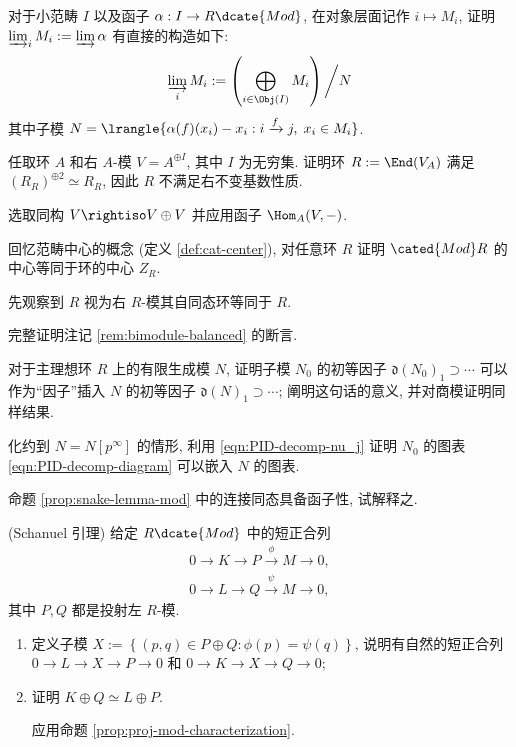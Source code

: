 \begin{Exercises}
	\item 对于小范畴 $I$ 以及函子 $\alpha: I \to R\dcate{Mod}$, 在对象层面记作 $i \mapsto M_i$, 证明 $\varinjlim_i M_i := \varinjlim \alpha$ 有直接的构造如下:
	\[ \varinjlim_i M_i := \left( \bigoplus_{i \in \Obj(I)} M_i \right) \bigg/N \]
	其中子模 $N = \lrangle{ \alpha(f)(x_i) - x_i : i \xrightarrow{f} j, \;  x_i \in M_i }$.
	\item 任取环 $A$ 和右 $A$-模 $V = A^{\oplus I}$, 其中 $I$ 为无穷集. 证明环 $R := \End(V_A)$ 满足 $(R_R)^{\oplus 2} \simeq R_R$, 因此 $R$ 不满足右不变基数性质. \begin{hint} 选取同构 $V \rightiso V \oplus V$ 并应用函子 $\Hom_A(V, -)$.\end{hint}
	\item 回忆范畴中心的概念 (定义 \ref{def:cat-center}), 对任意环 $R$ 证明 $\cated{Mod}R$ 的中心等同于环的中心 $Z_R$. \begin{hint} 先观察到 $R$ 视为右 $R$-模其自同态环等同于 $R$.\end{hint}
	\item 完整证明注记 \ref{rem:bimodule-balanced} 的断言.
	\item 对于主理想环 $R$ 上的有限生成模 $N$, 证明子模 $N_0$ 的初等因子 $\mathfrak{d}(N_0)_1 \supset \cdots$ 可以作为``因子''插入 $N$ 的初等因子 $\mathfrak{d}(N)_1 \supset \cdots$; 阐明这句话的意义, 并对商模证明同样结果. \begin{hint} 化约到 $N=N[p^\infty]$ 的情形, 利用 \eqref{eqn:PID-decomp-nu_j} 证明 $N_0$ 的图表 \eqref{eqn:PID-decomp-diagram} 可以嵌入 $N$ 的图表.\end{hint}
	\item 命题 \ref{prop:snake-lemma-mod} 中的连接同态具备函子性, 试解释之.
	\item (Schanuel 引理) 给定 $R\dcate{Mod}$ 中的短正合列
		\begin{gather*}
			0 \to K \to P \xrightarrow{\phi} M \to 0, \\
			0 \to L \to Q \xrightarrow{\psi} M \to 0,
		\end{gather*}
		其中 $P, Q$ 都是投射左 $R$-模.
		\begin{enumerate}
			\item 定义子模 $X := \left\{(p,q) \in P \oplus Q: \phi(p) = \psi(q) \right\}$, 说明有自然的短正合列 $0 \to L \to X \to P \to 0$ 和 $0 \to K \to X \to Q \to 0$;
			\item 证明 $K \oplus Q \simeq L \oplus P$. \begin{hint} 应用命题 \ref{prop:proj-mod-characterization}. \end{hint}

\end{enumerate}
\end{Exercises}
